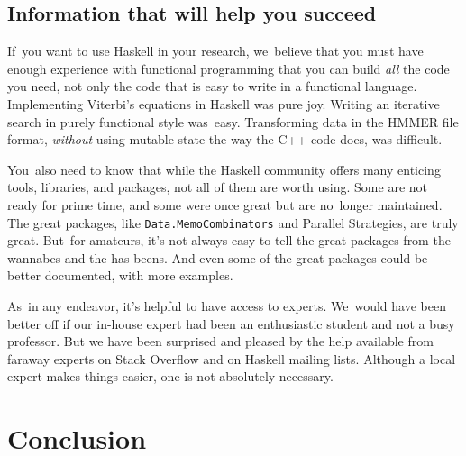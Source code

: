 \documentclass[nonatbib,preprint,blockstyle,times]{sigplanconf}
\newcommand\seclabel[1]{\label{sec:#1}}
\begin{document}
\subsection{Information that will help you succeed}

If~you want to use Haskell in your research, we~believe that you must
have enough experience with functional programming that you can build
\emph{all} the code you need, not only the code that is easy to write
in a functional language.
Implementing Viterbi's equations in Haskell was pure joy.
Writing an iterative search in purely functional style was~easy.
Transforming data in the HMMER file format, \emph{without}
using mutable state the way the C++ code does, was difficult.

\seclabel{penumbra}

You~also need to know that while the Haskell community offers many
enticing tools, libraries, and packages,
not all of them are worth using.
Some are not ready for prime time, and some were once great but are
no~longer maintained.
The great packages, like \texttt{Data.MemoCombinators} and Parallel
Strategies, are truly great.
But~for amateurs, it's not always easy to tell the great packages from the wannabes
and the has-beens.
And even some of the great packages could be better documented, with
more examples.



As~in any endeavor, it's helpful to have access to experts.
We~would have been better off if our in-house expert had been an
enthusiastic student and not a busy professor.
But we have been surprised and pleased by the help available from
faraway experts on Stack Overflow and on Haskell mailing lists.
Although a local expert makes things easier, one is not
 absolutely necessary.

\section{Conclusion}
\end{document}
